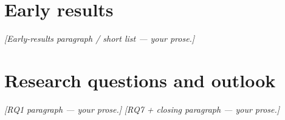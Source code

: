 \documentclass[11pt,a4paper]{article}
\begin{document}
\section*{Early results}
\textit{[Early-results paragraph / short list — your prose.]}

\section*{Research questions and outlook}
\textit{[RQ1 paragraph — your prose.]}
%
\textit{[RQ7 + closing paragraph — your prose.]}

\end{document}
